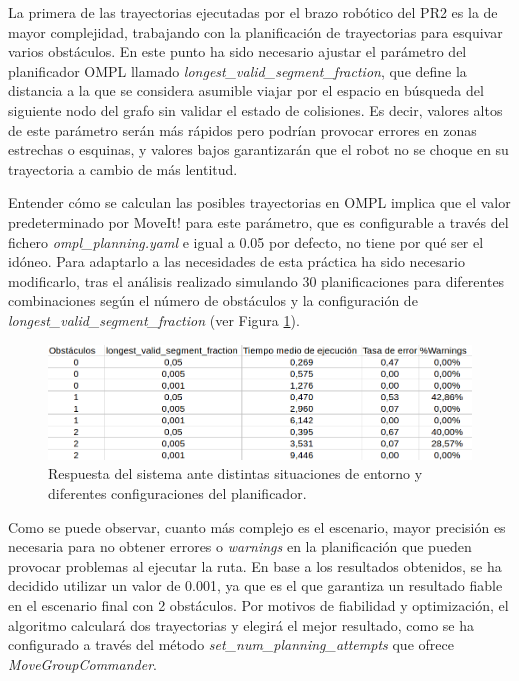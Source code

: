 \documentclass[12pt,spanish,chapterprefix, numbers=noenddot]{book}
\numberwithin{equation}{section}
\numberwithin{figure}{section}
\begin{document}
La primera de las trayectorias ejecutadas por el brazo robótico del PR2 es la de mayor complejidad, trabajando con la planificación de trayectorias para esquivar varios obstáculos. En este punto ha sido necesario ajustar el parámetro del planificador OMPL llamado \textit{longest\_valid\_segment\_fraction}, que define la distancia a la que se considera asumible viajar por el espacio en búsqueda del siguiente nodo del grafo sin validar el estado de colisiones. Es decir, valores altos de este parámetro serán más rápidos pero podrían provocar errores en zonas estrechas o esquinas, y valores bajos garantizarán que el robot no se choque en su trayectoria a cambio de más lentitud. 

Entender cómo se calculan las posibles trayectorias en OMPL implica que el valor predeterminado por MoveIt! para este parámetro, que es configurable a través del fichero \textit{ompl\_planning.yaml} e igual a 0.05 por defecto, no tiene por qué ser el idóneo. Para adaptarlo a las necesidades de esta práctica ha sido necesario modificarlo, tras el análisis  realizado simulando 30 planificaciones para diferentes combinaciones según el número de obstáculos y la configuración de \textit{longest\_valid\_segment\_fraction}  (ver Figura \ref{fig:analisis_ejecuciones}).

\begin{figure}[hbt!]
\centering
\includegraphics[width=14cm]{Figs/analisis_ejecuciones.png}
\par
\caption{\label{fig:analisis_ejecuciones}Respuesta del sistema ante distintas situaciones de entorno y diferentes configuraciones del planificador.}
\end{figure}

Como se puede observar, cuanto más complejo es el escenario, mayor precisión es necesaria para no obtener errores o \textit{warnings} en la planificación que pueden provocar problemas al ejecutar la ruta. En base a los resultados obtenidos, se ha decidido utilizar un valor de 0.001, ya que es el que garantiza un resultado fiable en el escenario final con 2 obstáculos. Por motivos de fiabilidad y optimización, el algoritmo calculará dos trayectorias y elegirá el mejor resultado, como se ha configurado a través del método \textit{set\_num\_planning\_attempts} que ofrece \textit{MoveGroupCommander}. 
\end{document}
